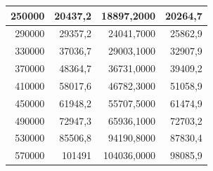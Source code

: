 \documentclass[a4paper, 12pt]{article}
\begin{document}
\begin{longtable}[c]{@{}rrrr@{}}
	\multicolumn{1}{|r|}{250000}                  & \multicolumn{1}{r|}{20437,2}                & \multicolumn{1}{r|}{18897,2000}                                                        & \multicolumn{1}{r|}{20264,7}                                                           \\* \midrule
	\multicolumn{1}{|r|}{290000}                  & \multicolumn{1}{r|}{29357,2}                & \multicolumn{1}{r|}{24041,7000}                                                        & \multicolumn{1}{r|}{25862,9}                                                           \\* \midrule
	\multicolumn{1}{|r|}{330000}                  & \multicolumn{1}{r|}{37036,7}                & \multicolumn{1}{r|}{29003,1000}                                                        & \multicolumn{1}{r|}{32907,9}                                                           \\* \midrule
	\multicolumn{1}{|r|}{370000}                  & \multicolumn{1}{r|}{48364,7}                & \multicolumn{1}{r|}{36731,0000}                                                        & \multicolumn{1}{r|}{39409,2}                                                           \\* \midrule
	\multicolumn{1}{|r|}{410000}                  & \multicolumn{1}{r|}{58017,6}                & \multicolumn{1}{r|}{46782,3000}                                                        & \multicolumn{1}{r|}{51058,9}                                                           \\* \midrule
	\multicolumn{1}{|r|}{450000}                  & \multicolumn{1}{r|}{61948,2}                & \multicolumn{1}{r|}{55707,5000}                                                        & \multicolumn{1}{r|}{61474,9}                                                           \\* \midrule
	\multicolumn{1}{|r|}{490000}                  & \multicolumn{1}{r|}{72947,3}                & \multicolumn{1}{r|}{65936,1000}                                                        & \multicolumn{1}{r|}{72703,2}                                                           \\* \midrule
	\multicolumn{1}{|r|}{530000}                  & \multicolumn{1}{r|}{85506,8}                & \multicolumn{1}{r|}{94190,8000}                                                        & \multicolumn{1}{r|}{87830,4}                                                           \\* \midrule
	\multicolumn{1}{|r|}{570000}                  & \multicolumn{1}{r|}{101491}                 & \multicolumn{1}{r|}{104036,0000}                                                       & \multicolumn{1}{r|}{98085,9}                                                           \\* \midrule

\end{longtable}
\end{document}
